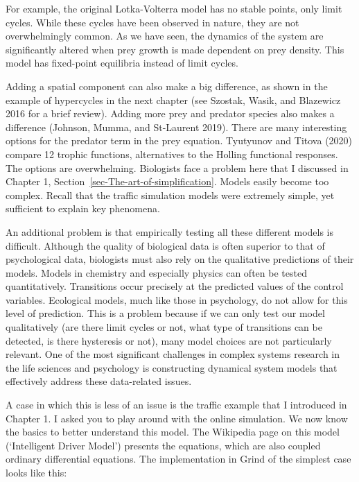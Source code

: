 \documentclass[
  a4paper,
  DIV=11,
  numbers=noendperiod,
  oneside]{scrreprt}
\begin{document}
For example, the original Lotka-Volterra model has no stable points,
only limit cycles. While these cycles have been observed in nature, they
are not overwhelmingly common. As we have seen, the dynamics of the
system are significantly altered when prey growth is made dependent on
prey density. This model has fixed-point equilibria instead of limit
cycles.

Adding a spatial component can also make a big difference, as shown in
the example of hypercycles in the next chapter (see Szostak, Wasik, and
Blazewicz 2016 for a brief review). Adding more prey and predator
species also makes a difference (Johnson, Mumma, and St-Laurent 2019).
There are many interesting options for the predator term in the prey
equation. Tyutyunov and Titova (2020) compare 12 trophic functions,
alternatives to the Holling functional responses. The options are
overwhelming. Biologists face a problem here that I discussed in Chapter
1, Section~\ref{sec-The-art-of-simplification}. Models easily become too
complex. Recall that the traffic simulation models were extremely
simple, yet sufficient to explain key phenomena.

An additional problem is that empirically testing all these different
models is difficult. Although the quality of biological data is often
superior to that of psychological data, biologists must also rely on the
qualitative predictions of their models. Models in chemistry and
especially physics can often be tested quantitatively. Transitions occur
precisely at the predicted values of the control variables. Ecological
models, much like those in psychology, do not allow for this level of
prediction. This is a problem because if we can only test our model
qualitatively (are there limit cycles or not, what type of transitions
can be detected, is there hysteresis or not), many model choices are not
particularly relevant. One of the most significant challenges in complex
systems research in the life sciences and psychology is constructing
dynamical system models that effectively address these data-related
issues.

A case in which this is less of an issue is the traffic example that I
introduced in Chapter 1. I asked you to play around with the online
simulation. We now know the basics to better understand this model. The
Wikipedia page on this model (`Intelligent Driver Model') presents the
equations, which are also coupled ordinary differential equations. The
implementation in Grind of the simplest case looks like this:
\end{document}
